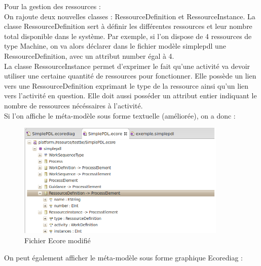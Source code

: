 \documentclass{report}
\begin{document}
Pour la gestion des ressources :\\

On rajoute deux nouvelles classes : RessourceDefinition et RessourceInstance.
La classe RessourceDefinition sert à définir les différentes ressources et leur nombre total disponible dans le système. Par exemple, si l'on dispose de 4 ressources de type Machine,
on va alors déclarer dans le fichier modèle simplepdl une RessourceDefinition, avec un attribut number égal à 4.\\

La classe RessourceInstance permet d'exprimer le fait qu'une activité va devoir utiliser une certaine quantité de ressources pour fonctionner.
Elle possède un lien vers une RessourceDefinition exprimant le type de la ressource ainsi qu'un lien vers l'activité en question.
Elle doit aussi posséder un attribut entier indiquant le nombre de ressources nécéssaires à l'activité.\\

Si l'on affiche le méta-modèle sous forme textuelle (améliorée), on a donc :\\

\begin{figure}[!h] 
\begin{center}
\includegraphics[width=10cm]{Capture-2.png}
\caption{Fichier Ecore modifié} 
\label{img1} 
\end{center}
\end{figure} 

On peut également afficher le méta-modèle sous forme graphique Ecorediag :\\
\end{document}
